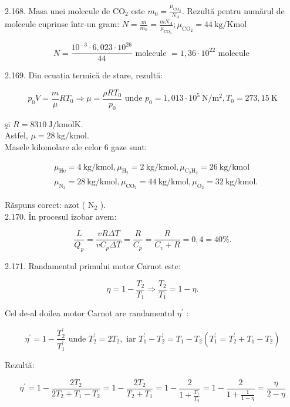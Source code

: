 \documentclass[10pt]{article}
\begin{document}
2.168. Masa unei molecule de $\mathrm{CO}_{2}$ este $m_{0}=\frac{\mu_{\mathrm{CO}_{2}}}{N_{A}}$. Rezultă pentru numărul de molecule cuprinse într-un gram: $N=\frac{m}{m_{0}}=\frac{m N_{A}}{\mu_{\mathrm{CO}_{2}}} ; \mu_{\mathrm{CO}_{2}}=44 \mathrm{~kg} / \mathrm{Kmol}$

$$
N=\frac{10^{-3} \cdot 6,023 \cdot 10^{26}}{44} \text { molecule }=1,36 \cdot 10^{22} \text { molecule }
$$

2.169. Din ecuația termică de stare, rezultă:

$$
p_{0} V=\frac{m}{\mu} R T_{0} \Rightarrow \mu=\frac{\rho R T_{0}}{p_{0}} \text { unde } p_{0}=1,013 \cdot 10^{5} \mathrm{~N} / \mathrm{m}^{2}, T_{0}=273,15 \mathrm{~K}
$$

şi $R=8310 \mathrm{~J} / \mathrm{kmolK}$.\\
Astfel, $\mu=28 \mathrm{~kg} / \mathrm{kmol}$.\\
Masele kilomolare ale celor 6 gaze sunt:

$$
\begin{aligned}
& \mu_{\mathrm{He}}=4 \mathrm{~kg} / \mathrm{kmol}, \mu_{\mathrm{H}_{2}}=2 \mathrm{~kg} / \mathrm{kmol}, \mu_{\mathrm{C}_{2} \mathrm{H}_{2}}=26 \mathrm{~kg} / \mathrm{kmol} \\
& \mu_{\mathrm{N}_{2}}=28 \mathrm{~kg} / \mathrm{kmol}, \mu_{\mathrm{CO}_{2}}=44 \mathrm{~kg} / \mathrm{kmol}, \mu_{\mathrm{O}_{2}}=32 \mathrm{~kg} / \mathrm{kmol} .
\end{aligned}
$$

Răspuns corect: azot ( $\mathrm{N}_{2}$ ).\\
2.170. În procesul izobar avem:

$$
\frac{L}{Q_{p}}=\frac{v R \Delta T}{v C_{p} \Delta T}=\frac{R}{C_{p}}=\frac{R}{C_{v}+R}=0,4=40 \% .
$$

2.171. Randamentul primului motor Carnot este:

$$
\eta=1-\frac{T_{2}}{T_{1}} \Rightarrow \frac{T_{2}}{T_{1}}=1-\eta .
$$

Cel de-al doilea motor Carnot are randamentul $\eta^{\prime}$ :

$$
\eta^{\prime}=1-\frac{T_{2}^{\prime}}{T_{1}^{\prime}} \text { unde } T_{2}^{\prime}=2 T_{2}, \text { iar } T_{1}^{\prime}-T_{2}^{\prime}=T_{1}-T_{2}\left(T_{1}^{\prime}=T_{2}^{\prime}+T_{1}-T_{2}\right)
$$

Rezultă:

$$
\eta^{\prime}=1-\frac{2 T_{2}}{2 T_{2}+T_{1}-T_{2}}=1-\frac{2 T_{2}}{T_{2}+T_{1}}=1-\frac{2}{1+\frac{T_{1}}{T_{2}}}=1-\frac{2}{1+\frac{1}{1-\eta}}=\frac{\eta}{2-\eta}
$$
\end{document}
